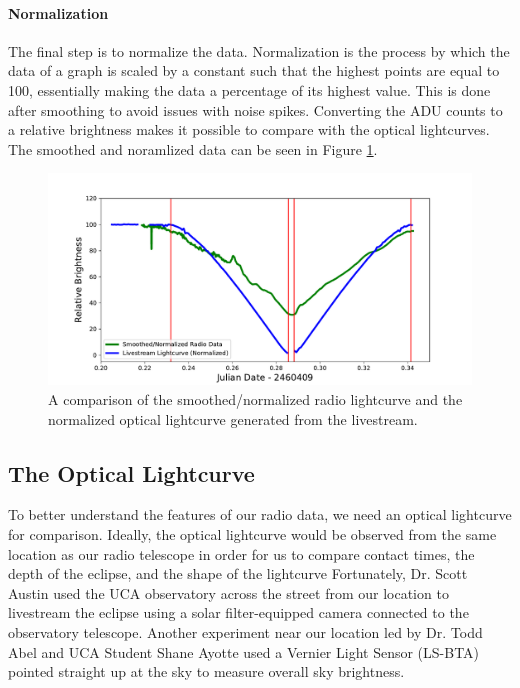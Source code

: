 \paragraph{Normalization}
The final step is to normalize the data.
Normalization is the process by which the data of a graph is scaled by a constant such that the highest points are equal to 100, essentially making the data a percentage of its highest value.
This is done after smoothing to avoid issues with noise spikes.
Converting the ADU counts to a relative brightness makes it possible to compare with the optical lightcurves.
The smoothed and noramlized data can be seen in Figure \ref{fig:RadioOpticalComparison}.


\begin{figure}[h]
    \includegraphics[width=\textwidth]{figures/SNRadioVLivestream}
    \caption{\label{fig:RadioOpticalComparison} A comparison of the smoothed/normalized radio lightcurve and the normalized optical lightcurve generated from the livestream.}
\end{figure}



\subsection{\label{sec:optical}The Optical Lightcurve}

To better understand the features of our radio data, we need an optical lightcurve for comparison.
Ideally, the optical lightcurve would be observed from the same location as our radio telescope in order for us to compare contact times, the depth of the eclipse, and the shape of the lightcurve
Fortunately, Dr. Scott Austin used the UCA observatory across the street from our location to livestream the eclipse using a solar filter-equipped camera connected to the observatory telescope.
Another experiment near our location led by Dr. Todd Abel and UCA Student Shane Ayotte used a Vernier Light Sensor (LS-BTA) pointed straight up at the sky to measure overall sky brightness.
